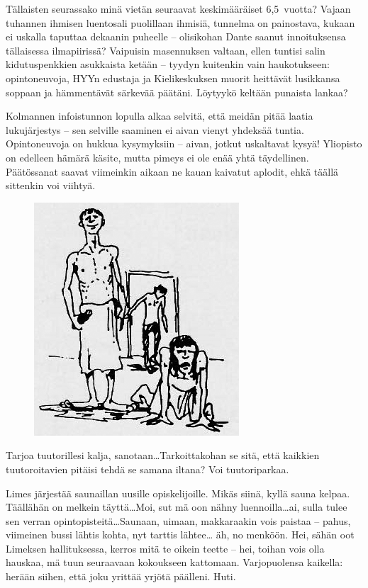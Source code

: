 \documentclass[a5paper, 8pt, twocolumn]{book} %
\numberwithin{equation}{section}
\begin{document}
Tällaisten seurassako minä vietän seuraavat
keski\-määräiset 6,5~vuotta? Vajaan
tuhannen ihmisen luentosali puolillaan ihmisiä,
tunnelma on painostava, kukaan ei
uskalla taputtaa dekaanin puheelle -- olisikohan
Dante saanut innoituksensa tällaisessa
ilmapiirissä? Vaipuisin masennuksen
valtaan, ellen tuntisi salin kidutus\-penkkien
asukkaista ketään -- tyydyn kuitenkin
vain haukotukseen: opintoneuvoja, HYYn
edustaja ja Kielikeskuksen muorit heittävät
lusikkansa soppaan ja hämmentävät
särkevää päätäni. Löytyykö keltään punaista
lankaa?

Kolmannen info\-istunnon lopulla alkaa
selvitä, että meidän pitää laatia luku\-järjestys
-- sen selville saaminen ei aivan
vienyt yhdeksää tuntia. Opinto\-neuvoja on
hukkua kysymyksiin -- aivan, jotkut uskaltavat
kysyä! Yliopisto on edelleen hämärä
käsite, mutta pimeys ei ole enää yhtä
täydellinen. Päätös\-sanat saavat viimeinkin
aikaan ne kauan kaivatut aplodit, ehkä täällä
sittenkin voi viihtyä.

\begin{figure}
	\centering
	\includegraphics[width=0.8\columnwidth]{pallohukassa1.png}
\end{figure}
Tarjoa tuutorillesi kalja, sanotaan\dots Tarkoittakohan se sitä, että kaikkien tuutoroitavien pitäisi tehdä se samana iltana?
Voi tuutori\-parkaa.

Limes järjestää sauna\-illan uusille opiskelijoille.
Mikäs siinä, kyllä sauna kelpaa.
Täällähän on melkein täyttä\dots Moi, sut mä
oon nähny luennoilla\dots ai, sulla tulee sen
verran opintopisteitä\dots Saunaan, uimaan,
makkaraakin vois paistaa -- pahus, viimeinen
bussi lähtis kohta, nyt tarttis lähtee\dots
äh, no menköön. Hei, sähän oot Limeksen
hallituksessa, kerros mitä te oikein teette
-- hei, toihan vois olla hauskaa,
mä tuun seuraavaan kokoukseen kattomaan. Varjo\-puolensa
kaikella: herään
siihen, että joku
yrittää yrjötä päälleni.
Huti.
\end{document}
